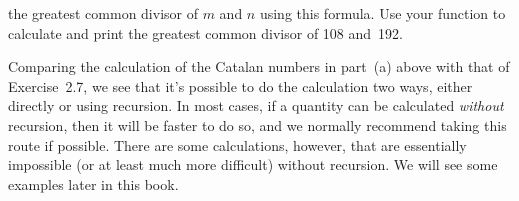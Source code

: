 \documentclass[12pt]{article}
\begin{document}
\begin{exercises}
\begin{enumerate}
the greatest common divisor of $m$ and $n$ using this formula.  Use your
function to calculate and print the greatest common divisor of 108 and~192.
\end{enumerate}
Comparing the calculation of the Catalan numbers in part~(a) above with
that of Exercise~2.7, we see that it's possible to do the calculation two
ways, either directly or using recursion.  In most cases, if a quantity can
be calculated \emph{without} recursion, then it will be faster to do so,
and we normally recommend taking this route if possible.  There are some
calculations, however, that are essentially impossible (or at least much
more difficult) without recursion.  We will see some examples later in this
book.

\end{exercises}
\end{document}
